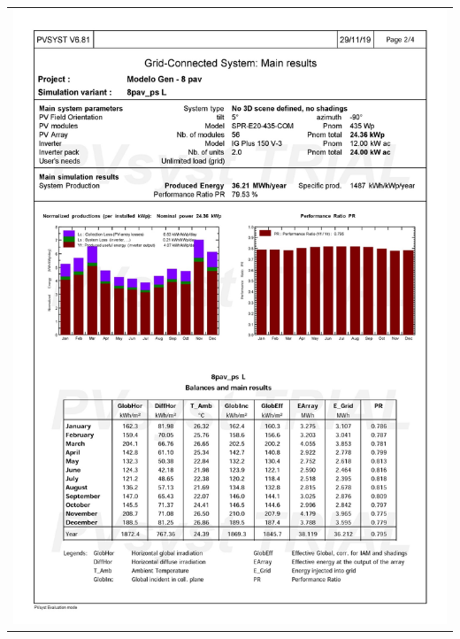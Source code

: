 \begin{table}[H]
    \centering
    \begin{tabular}{l}
        \includegraphics[width=\textwidth]{figures/attachments/resultpv16.jpg}
    \end{tabular}
\end{table}
\pagebreak
